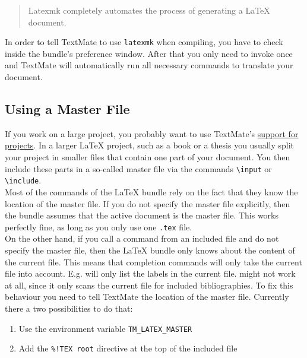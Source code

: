 \documentclass[11pt, x11names]{article}
\begin{document}
\begin{quote}
    Latexmk completely automates the process of generating a LaTeX document.
\end{quote}

\begin{sloppypar}
In order to tell TextMate to use \texttt{latexmk} when compiling, you have to check  inside the bundle's preference window. After that you only need to invoke  once and TextMate will automatically run all necessary commands to translate your document.
\end{sloppypar}

\subsection{Using a Master File}

If you work on a large project, you probably want to use TextMate's \href{http://manual.textmate.org/projects}{support for projects}. In a larger LaTeX project, such as a book or a thesis you usually split your project in smaller files that contain one part of your document. You then include these parts in a so-called master file via the commands \texttt{\textbackslash{}input} or \texttt{\textbackslash{}include}.\\

Most of the commands of the LaTeX bundle rely on the fact that they know the location of the master file. If you do not specify the master file explicitly, then the bundle assumes that the active document is the master file. This works perfectly fine, as long as you only use one \texttt{.tex} file.\\

On the other hand, if you call a command from an included file and do not specify the master file, then the LaTeX bundle only knows about the content of the current file. This means that completion commands will only take the current file into account. E.g.  will only list the labels in the current file.  might not work at all, since it only scans the current file for included bibliographies. To fix this behaviour you need to tell TextMate the location of the master file. Currently there a two possibilities to do that:

\begin{enumerate}
    \item Use the environment variable \texttt{TM\_LATEX\_MASTER}
    \item Add the \texttt{\%!TEX\ root} directive at the top of the included file
\end{enumerate}
\end{document}
